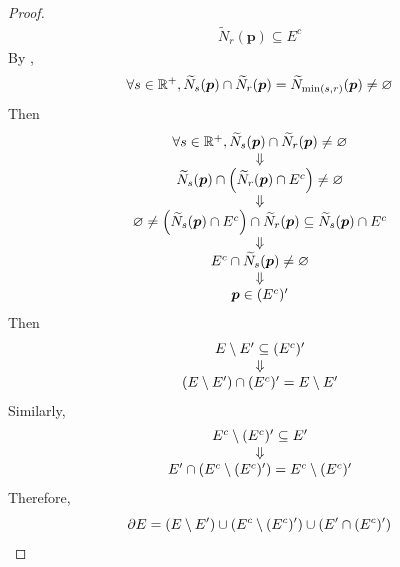 \begin{proof}
\[\begin{array}{c}
        \widetilde{N}_{r}(\bm{p}) \subseteq E^{c}
    \end{array}
    \]
    By ,
    \[
    \forall s \in \R^{+}, \widetilde{N}_{s}(\bm{p}) \cap \widetilde{N}_{r}(\bm{p}) =
    \widetilde{N}_{\min(s,r)}(\bm{p}) \neq \vnot
    \]
    Then
    \[
    \begin{array}{c}
        \forall s \in \R^{+}, \widetilde{N}_{s}(\bm{p}) \cap \widetilde{N}_{r}(\bm{p}) \neq \vnot \\
        \Downarrow \\
        \widetilde{N}_{s}(\bm{p}) \cap \paren*{\widetilde{N}_{r}(\bm{p}) \cap E^{c}} \neq \vnot \\
        \Downarrow \\
        \vnot \neq \paren*{\widetilde{N}_{s}(\bm{p}) \cap E^{c}} \cap \widetilde{N}_{r}(\bm{p})
        \subseteq \widetilde{N}_{s}(\bm{p}) \cap E^{c} \\
        \Downarrow \\
        E^{c} \cap \widetilde{N}_{s}(\bm{p}) \neq \vnot \\
        \Downarrow \\
        \bm{p} \in (E^{c})'
    \end{array}
    \]
    Then
    \[
    \begin{array}{c}
        E \setminus E' \subseteq (E^{c})' \\
        \Downarrow \\
        \paren*{E \setminus E'} \cap (E^{c})' = E \setminus E'
    \end{array}
    \]
    Similarly,
    \[
    \begin{array}{c}
        E^{c} \setminus (E^{c})' \subseteq E' \\
        \Downarrow \\
        E' \cap \paren*{E^{c} \setminus (E^{c})'} = E^{c} \setminus (E^{c})'
    \end{array}
    \]
    Therefore,
    \[
    \partial E = \paren*{E \setminus E'} \cup \paren*{E^{c} \setminus (E^{c})'} \cup \paren*{E' \cap (E^{c})'}
    \]
\end{proof}

\bigskip

